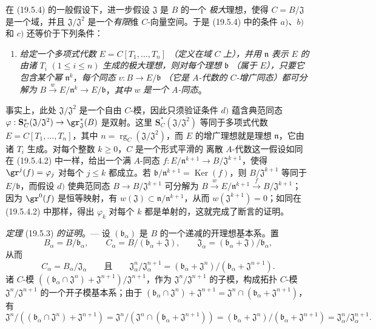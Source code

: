 \begin{remark}[19.5.5]
\label{0.19.5.5-fr}
在 (19.5.4) 的一般假设下，进一步假设 $\mathfrak J$ 是 $B$ 的一个
\emph{极大}理想，使得 $C=B/\mathfrak J$ 是一个域，并且
$\mathfrak J/\mathfrak J^2$ 是一个\emph{有限}维 $C$-向量空间。于是 (19.5.4)
中的条件 $a)$、$b)$ 和 $c)$ 还等价于下列条件：
\begin{enumerate}
  \item[d)] \emph{给定一个多项式代数} $E=C[T_1,\ldots,T_n]$
  \emph{（定义在域} $C$ \emph{上），并用} $\mathfrak n$ \emph{表示} $E$
  \emph{的由诸} $T_i$ $(1\leq i\leq n)$ \emph{生成的极大理想，则对每个理想}
  $\mathfrak b$ \emph{（属于} $E$\emph{），只要它包含某个幂}
  $\mathfrak n^k$，\emph{每个同态} $v:B\to E/\mathfrak b$ \emph{（它是
  $A$-代数的 $C$-增广同态）都可分解为}
  $B\xrightarrow{w}E/\mathfrak n^k\to E/\mathfrak b$，\emph{其中} $w$
  \emph{是一个 $A$-同态}。
\end{enumerate}
事实上，此处 $\mathfrak J/\mathfrak J^2$ 是一个自由 $C$-模，因此只须验证条件
$d)$ 蕴含典范同态
$\varphi:\mathbf S_C^*(\mathfrak J/\mathfrak J^2)\to\gr_{\mathfrak J}^*(B)$
是双射。这里 $\mathbf S_C^*(\mathfrak J/\mathfrak J^2)$ 等同于多项式代数
$E=C[T_1,\ldots,T_n]$，其中
$n=\operatorname{rg}_C(\mathfrak J/\mathfrak J^2)$，而 $E$ 的增广理想就是理想
$\mathfrak n$，它由诸 $T_i$ 生成。对每个整数 $k\geq0$，$C$ 是一个形式平滑的
离散 $A$-代数这一假设如同在 (19.5.4.2) 中一样，给出一个满 $A$-同态
$f:E/\mathfrak n^{k+1}\to B/\mathfrak J^{k+1}$，使得
$\gr^j(f)=\varphi_j$ 对每个 $j\leq k$ 都成立。若
$\mathfrak b/\mathfrak n^{k+1}=\operatorname{Ker}(f)$，则
$B/\mathfrak J^{k+1}$ 等同于 $E/\mathfrak b$，而假设 $d)$ 使典范同态
$B\to B/\mathfrak J^{k+1}$ 可分解为
$B\xrightarrow{w}E/\mathfrak n^{k+1}\xrightarrow{f}B/\mathfrak J^{k+1}$；
因为 $\gr^0(f)$ 是恒等映射，有
$w(\mathfrak J)\subset\mathfrak n/\mathfrak n^{k+1}$，从而
$w(\mathfrak J^{k+1})=0$；如同在 (19.5.4.2) 中那样，得出
$\varphi_k$ 对每个 $k$ 都是单射的，这就完成了断言的证明。
\end{remark}

\begin{env}[19.5.6]
\label{0.19.5.6-fr}
\emph{定理} (19.5.3) \emph{的证明}。--- 设
$(\mathfrak b_\alpha)$ 是 $B$ 的一个递减的开理想基本系。置
\[
  B_\alpha=B/\mathfrak b_\alpha,\qquad
  C_\alpha=B/(\mathfrak b_\alpha+\mathfrak J),\qquad
  \mathfrak J_\alpha=(\mathfrak b_\alpha+\mathfrak J)/\mathfrak b_\alpha,
\]
从而
\[
  C_\alpha=B_\alpha/\mathfrak J_\alpha\qquad\text{且}\qquad
  \mathfrak J_\alpha^n/\mathfrak J_\alpha^{n+1}
  =(\mathfrak b_\alpha+\mathfrak J^n)/(\mathfrak b_\alpha+\mathfrak J^{n+1}).
\]
诸 $C$-模
$((\mathfrak b_\alpha\cap\mathfrak J^n)+\mathfrak J^{n+1})/
\mathfrak J^{n+1}$，作为 $\mathfrak J^n/\mathfrak J^{n+1}$ 的子模，构成拓扑 $C$-模
$\mathfrak J^n/\mathfrak J^{n+1}$ 的一个开子模基本系；由于
$(\mathfrak b_\alpha\cap\mathfrak J^n)+\mathfrak J^{n+1}
=\mathfrak J^n\cap(\mathfrak b_\alpha+\mathfrak J^{n+1})$，有
\[
  \mathfrak J^n/((\mathfrak b_\alpha\cap\mathfrak J^n)+\mathfrak J^{n+1})
  =\mathfrak J^n/(\mathfrak J^n\cap(\mathfrak b_\alpha+\mathfrak J^{n+1}))
  =(\mathfrak b_\alpha+\mathfrak J^n)/(\mathfrak b_\alpha+\mathfrak J^{n+1})
  =\mathfrak J_\alpha^n/\mathfrak J_\alpha^{n+1}.
\]
\end{env}


